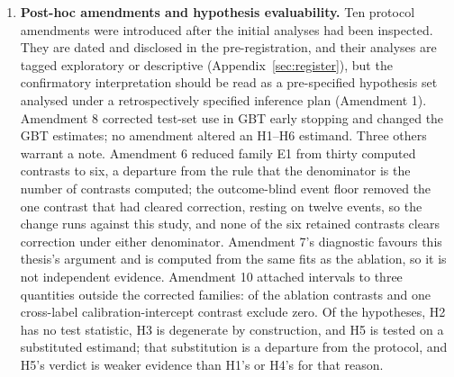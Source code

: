 \begin{enumerate}
    \item \textbf{Post-hoc amendments and hypothesis evaluability.} Ten
    protocol amendments were introduced after the initial analyses had been
    inspected. They are dated and disclosed in the pre-registration, and their
    analyses are tagged exploratory or descriptive (Appendix~\ref{sec:register}),
    but the confirmatory interpretation should be read as a pre-specified
    hypothesis set analysed under a retrospectively specified inference plan
    (Amendment 1). Amendment 8 corrected test-set use in GBT early stopping and
    changed the GBT estimates; no amendment altered an H1--H6 estimand. Three
    others warrant a note. Amendment 6 reduced family E1 from thirty computed
    contrasts to six, a departure from the rule that the denominator is the
    number of contrasts computed; the outcome-blind event floor removed the one
    contrast that had cleared correction, resting on twelve events, so the
    change runs against this study, and none of the six retained contrasts
    clears correction under either denominator. Amendment 7's diagnostic
    favours this thesis's argument and is computed from the same fits as the
    ablation, so it is not independent evidence. Amendment 10 attached
    intervals to three quantities outside the corrected families:
    \pcAblNExcludeZero{} of the \pcAblNContrasts{} ablation contrasts and one
    cross-label calibration-intercept contrast exclude zero. Of the
    hypotheses, H2 has no test statistic, H3 is degenerate by construction,
    and H5 is tested on a substituted estimand; that substitution is a
    departure from the protocol, and H5's verdict is weaker evidence than H1's
    or H4's for that reason.
\end{enumerate}
